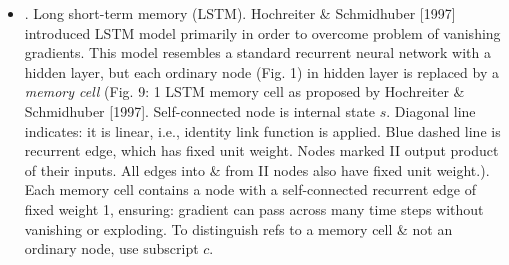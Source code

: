 \documentclass{article}
\begin{document}
\begin{enumerate}
\begin{itemize}
\begin{itemize}
			\item {. Long short-term memory (LSTM).} Hochreiter \& Schmidhuber [1997] introduced LSTM model primarily in order to overcome problem of vanishing gradients. This model resembles a standard recurrent neural network with a hidden layer, but each ordinary node (Fig. 1) in hidden layer is replaced by a {\it memory cell} ({\sf Fig. 9: 1 LSTM memory cell as proposed by Hochreiter \& Schmidhuber [1997]. Self-connected node is internal state $s$. Diagonal line indicates: it is linear, i.e., identity link function is applied. Blue dashed line is recurrent edge, which has fixed unit weight. Nodes marked II output product of their inputs. All edges into \& from II nodes also have fixed unit weight.}). Each memory cell contains a node with a self-connected recurrent edge of fixed weight 1, ensuring: gradient can pass across many time steps without vanishing or exploding. To distinguish refs to a memory cell \& not an ordinary node, use subscript $c$.
			

\end{itemize}
\end{itemize}
\end{enumerate}
\end{document}
